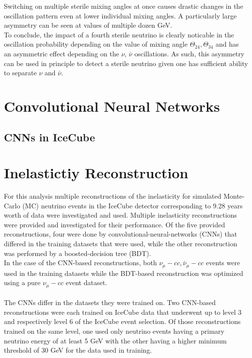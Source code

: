 \documentclass[a4paper,12pt,numbered]{article}
\begin{document}
Switching on multiple sterile mixing angles at once causes drastic changes in the oscillation pattern even at lower individual mixing angles. A particularly large asymmetry
can be seen at values of multiple dozen GeV.
~\\

To conclude, the impact of a fourth sterile neutrino is clearly noticable in the oscillation probability depending on the value of mixing angle $\Theta_{24}, \Theta_{34}$ and has an asymmetric effect depending on the $\nu$, $\bar{\nu}$ oscillations. As such, this asymmetry can be used in principle to detect a sterile neutrino given one has sufficient ability to separate $\nu$ and $\bar{\nu}$.

\section{Convolutional Neural Networks}

\subsection{CNNs in IceCube}

\section{Inelastictiy Reconstruction}

For this analysis multiple reconstructions of the inelasticity for simulated Monte-Carlo (MC) neutrino events in the IceCube detector corresponding to 9.28 years worth of data were investigated and used. 
Multiple inelasticity reconstructions were provided and investigated for their performance. Of the five provided reconstructions, four were done by convolutional-neural-networks (CNNs) that differed in the training datasets that were used, while the other reconstruction was performed by a boosted-decision tree (BDT).
\\
In the case of the CNN-based reconstructions, both $\nu_\mu-cc, \bar{\nu}_\mu-cc$ events were used in the training datasets while the BDT-based reconstruction was optimized using a pure $\nu_\mu-cc$ event dataset.
\\ \\
The CNNs differ in the datasets they were trained on. Two CNN-based reconstructions were each trained on IceCube data that underwent up to level 3 and respectively level 6 of the IceCube event selection. Of those reconstructions trained on the same level, one used only neutrino events having a primary neutrino energy of at least 5 GeV with the other having a higher minimum threshold of 30 GeV for the data used in training.
\end{document}
